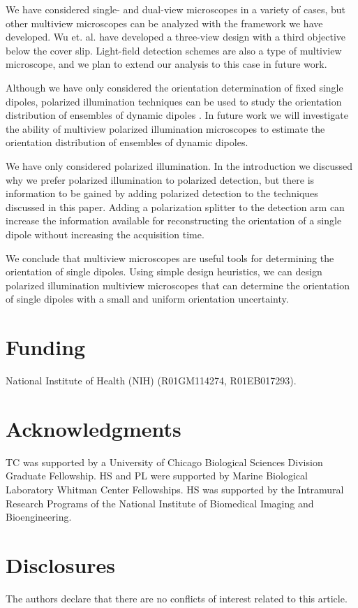 \documentclass[10pt]{article}
\begin{document}
We have considered single- and dual-view microscopes in a variety of cases, but
other multiview microscopes can be analyzed with the framework we have
developed. Wu et. al. have developed a three-view design with a third objective
below the cover slip\cite{wu2016}. Light-field detection schemes are also a type
of multiview microscope\cite{levoy2006}, and we plan to extend our analysis to
this case in future work.

Although we have only considered the orientation determination of fixed single
dipoles, polarized illumination techniques can be used to study the orientation
distribution of ensembles of dynamic dipoles \cite{mehta2016, backer2016}. In
future work we will investigate the ability of multiview polarized illumination
microscopes to estimate the orientation distribution of ensembles of dynamic
dipoles.

We have only considered polarized illumination. In the introduction
we discussed why we prefer polarized illumination to polarized detection, but
there is information to be gained by adding polarized detection to the
techniques discussed in this paper. Adding a polarization splitter to the
detection arm can increase the information available for reconstructing the
orientation of a single dipole without increasing the acquisition time.

We conclude that multiview microscopes are useful tools for determining the
orientation of single dipoles. Using simple design heuristics, we can design
polarized illumination multiview microscopes that can determine the orientation
of single dipoles with a small and uniform orientation uncertainty.

\section*{Funding}
National Institute of Health (NIH) (R01GM114274, R01EB017293).

\section*{Acknowledgments}
TC was supported by a University of Chicago Biological Sciences Division
Graduate Fellowship. HS and PL were supported by Marine Biological Laboratory
Whitman Center Fellowships. HS was supported by the Intramural Research
Programs of the National Institute of Biomedical Imaging and Bioengineering.

\section*{Disclosures}
The authors declare that there are no conflicts of interest related to this article.
\end{document}
